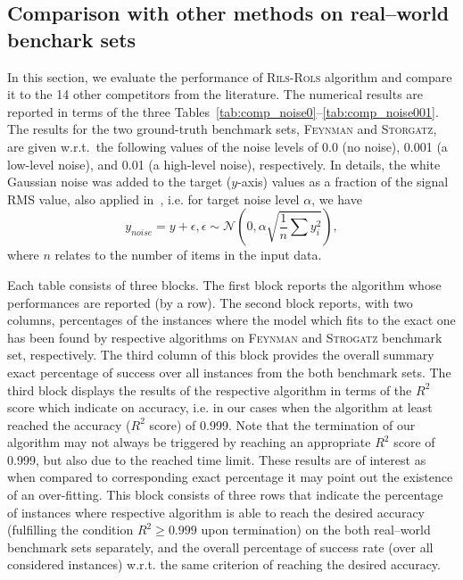 \documentclass[a4paper,12pt]{elsarticle}
\begin{document}

\subsection{Comparison with other methods on real--world benchark sets}
In this section, we evaluate the performance of \textsc{Rils-Rols} algorithm and compare it to the 14 other competitors from the literature. The numerical results are reported in terms of the three Tables~\ref{tab:comp_noise0}--\ref{tab:comp_noise001}. The results for the two ground-truth benchmark sets, \textsc{Feynman} and \textsc{Storgatz}, are given w.r.t.\   the following values of the noise levels of 0.0 (no noise), 0.001 (a low-level noise), and 0.01 (a high-level noise), respectively. In details, the white Gaussian noise was added to the target ($y$-axis) values as a fraction of the signal RMS value, also applied in~\cite{la2021contemporary}, i.e. for target noise level $\alpha$, we have
$$ y_{noise} = y + \epsilon, \epsilon \sim \mathcal{N}\left(0, \alpha \sqrt{\frac{1}{n} \sum {y_i^2}}\right),$$
where $n$ relates to the number of items in the input data.

Each table consists of three blocks. The first block reports the algorithm whose performances are reported (by a row). The second block reports, with two columns,  percentages of the instances where the model which fits to the exact one has been found by respective algorithms on \textsc{Feynman} and \textsc{Strogatz} benchmark set, respectively. The third column of this block provides the overall summary exact percentage of success over all instances from the both benchmark sets. The third block displays the results of the respective algorithm in terms of the $R^2$ score which indicate on  accuracy, i.e. in our cases when the algorithm  at least reached the accuracy ($R^2$ score) of 0.999.  Note that the termination of our algorithm may not always be triggered by reaching an appropriate $R^2$ score of 0.999, but also due to the reached time limit. These results are of interest as when compared to corresponding exact percentage it may point out the existence of an over-fitting. This block consists of three rows that indicate the percentage of instances where respective algorithm is able to reach the desired accuracy (fulfilling the condition $R^2 \geq 0.999$ upon termination) on the both real--world benchmark sets separately, and the overall percentage of success rate (over all considered instances) w.r.t. the same criterion of reaching the desired accuracy.
\end{document}
